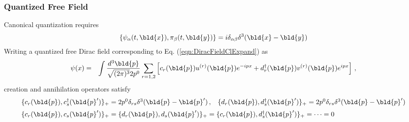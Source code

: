 \subsubsection{Quantized Free Field}
Canonical quantization requires
\begin{eqnarray}
\{
\psi_\alpha (t, \bld{x}), \pi_\beta(t, \bld{y}) \}
=
i \delta_{\alpha \beta }
\delta^3(\bld{x} - \bld{y})
\end{eqnarray}
Writing a quantized free Dirac field
corresponding to Eq. (\ref{eqn:DiracFieldClExpand}) as
\begin{eqnarray}
\psi(x) 
&=&
\int \frac{d^3 \bld{p}}{\sqrt{(2\pi)^3} 2 p^0}
\sum_{r = 1,2}
\left[
c_r(\bld{p}) u^{(r)}(\bld{p}) e^{-ipx}
+
d_r^\dagger(\bld{p}) v^{(r)}(\bld{p}) e^{ipx}
\right]
\,,
\nonumber\\
\label{eqn:DiracFieldExpand}
\end{eqnarray}
creation and annihilation operators satisfy
\begin{eqnarray}
\begin{array}{l}
\{ c_r(\bld{p}), c^\dagger_s(\bld{p}') \}_+
=
2 p^0 \delta_{rs}
\delta^3(\bld{p}-\bld{p}')\,,
\hspace{3mm}
\{ d_r(\bld{p}), d^\dagger_s(\bld{p}') \}_+
=
2 p^0 \delta_{rs}
\delta^3(\bld{p}-\bld{p}')
\vspace{2mm}
\\
\{ c_r(\bld{p}), c_s(\bld{p}') \}_+
=
\{ d_r(\bld{p}), d_s(\bld{p}') \}_+
=
\{ c_r(\bld{p}), d^\dagger_s(\bld{p}') \}_+
=
\dots
= 0
\end{array}
\end{eqnarray}
\begin{comment}
\begin{equation}
\{ c(\bld{p}, s), c^\dagger(\bld{p}', s') \}
=
\{ d(\bld{p}, s), d^\dagger(\bld{p}', s') \}
=
2p^0 \delta_{ss'}
\delta^3(\bld{p} - \bld{p}')
\end{equation}
\begin{equation}
\begin{array}{l}
(\slashed{p} - m) u(\bld{p}, s) = 0\,,
\hspace{3mm}
\bar{u}(\bld{p}, s)(\slashed{p} - m)  = 0\,,
\\
(\slashed{p} + m) v(\bld{p}, s) = 0\,,
\hspace{3mm}
\bar{v}(\bld{p}, s)(\slashed{p} + m)  = 0\,,
\end{array}
\end{equation}
\end{comment}

